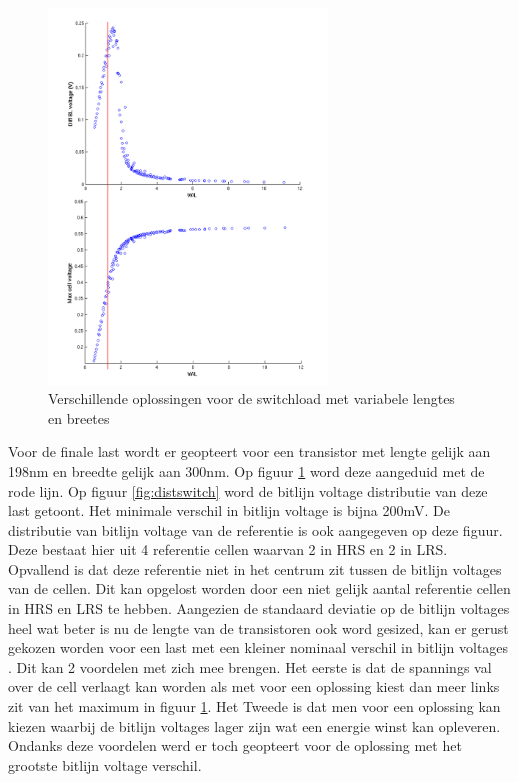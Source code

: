 \begin{figure}[!ht]
  \centering
  \includegraphics[width=0.66\textwidth]{../fig/hfdst-last-length.png}
  \caption{Verschillende oplossingen voor de switchload met variabele lengtes en breetes}
  \label{fig:length}
\end{figure}

Voor de finale last wordt er geopteert voor een transistor met lengte gelijk aan 198nm en breedte gelijk aan 300nm. Op figuur \ref{fig:length} word deze aangeduid met de rode lijn. Op figuur \ref{fig:distswitch} word de bitlijn voltage distributie van deze last getoont. Het minimale verschil in bitlijn voltage is bijna 200mV. De distributie van bitlijn voltage van de referentie is ook aangegeven op deze figuur. Deze bestaat hier uit 4 referentie cellen waarvan 2 in HRS en 2 in LRS. Opvallend is dat deze referentie niet in het centrum zit tussen de bitlijn voltages van de cellen. Dit kan opgelost worden door een niet gelijk aantal referentie cellen in HRS en LRS te hebben. Aangezien de standaard deviatie op de bitlijn voltages heel wat beter is nu de lengte van de transistoren ook word gesized, kan er gerust gekozen worden voor een last met een kleiner nominaal verschil in bitlijn voltages \label{anderelast}. Dit kan 2 voordelen met zich mee brengen. Het eerste is dat de spannings val over de cell verlaagt kan worden als met voor een oplossing kiest dan meer links zit van het maximum in figuur \ref{fig:length}. Het Tweede is dat men voor een oplossing kan kiezen waarbij de bitlijn voltages lager zijn wat een energie winst kan opleveren. Ondanks deze voordelen werd er toch geopteert voor de oplossing met het grootste bitlijn voltage verschil.

